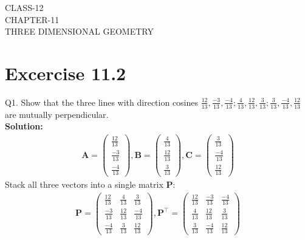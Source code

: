 \documentclass[12pt]{article}
\newcommand{\solution}{\noindent \textbf{Solution: }}
\newcommand{\myvec}[1]{\ensuremath{\begin{pmatrix}#1\end{pmatrix}}}
\let\vec\mathbf
\begin{document}
\begin{center}
\textbf\large{CLASS-12 \\ CHAPTER-11 \\ THREE DIMENSIONAL GEOMETRY}
\end{center}
\section*{Excercise 11.2}

Q1. Show that the three lines with direction cosines $\frac{12}{13}, \frac{-3}{13}, \frac{-4}{13}; \frac{4}{13}, \frac{12}{13}, \frac{3}{13}; \frac{3}{13}, \frac{-4}{13}, \frac{12}{13}$ are mutually perpendicular.
\\
\solution
	\begin{align}
			\vec{A}=\myvec{\frac{12}{13}\\[2pt]\frac{-3}{13}\\[2pt]\frac{-4}{13}},\vec{B}=\myvec{\frac{4}{13}\\[2pt]\frac{12}{13}\\[2pt]\frac{3}{13}},\vec{C}=\myvec{\frac{3}{13}\\[2pt]\frac{-4}{13}\\[2pt]\frac{12}{13}}
		\end{align}
		Stack all three vectors into a single matrix $\vec{P}$:
			\begin{align}
		\vec{P}=\myvec{\frac{12}{13}&\frac{4}{13}    &\frac{3}{13}\\[2pt] \frac{-3}{13}&\frac{12}{13}&\frac{-4}{13}\\[2pt] \frac{-4}{13}&\frac{3}{13}&\frac{12}{13}}, \vec{P}^\top=\myvec{\frac{12}{13}&\frac{-3}{13}   &\frac{-4}{13}\\[2pt] \frac{4}{13}&\frac{12}{13}&\frac{3}{13}\\[2pt] \frac{3}{13}&\frac{-4}{13}&\frac{12}{13}}
			\end{align}
\end{document}
